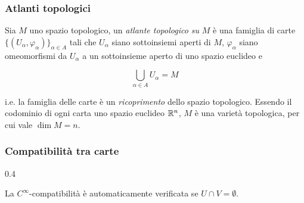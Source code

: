 \subsubsection{Atlanti topologici}

Sia $ M $ uno spazio topologico, un \textit{atlante topologico su} $ M $ è una famiglia di carte $ \{(U_{\alpha},\varphi_{\alpha})\}_{\alpha \in A} $ tali che $ U_{\alpha} $ siano sottoinsiemi aperti di $ M $, $ \varphi_{\alpha} $ siano omeomorfismi da $ U_{\alpha} $ a un sottoinsieme aperto di uno spazio euclideo e

\begin{equation}
	\bigcup_{\alpha \in A} U_{\alpha} = M
\end{equation}

i.e. la famiglia delle carte è un \textit{ricoprimento} dello spazio topologico. Essendo il codominio di ogni carta uno spazio euclideo $ \mathbb{R}^{n} $, $ M $ è una varietà topologica, per cui vale $ \dim M = n $.

\subsubsection{Compatibilità tra carte}

	{0.4}{%
		}
	

\begin{remark}
	La $ C^{\infty} $-compatibilità è automaticamente verificata se $ U \cap V = \emptyset $.
\end{remark}

